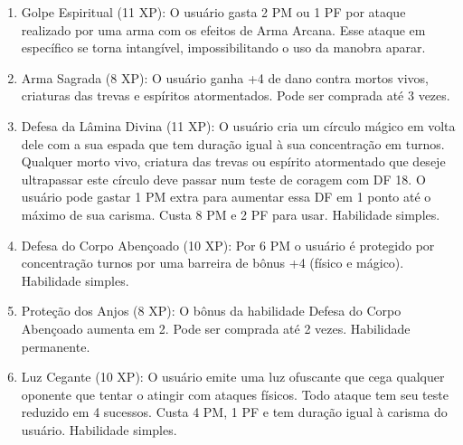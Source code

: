 \begin{enumerate}
  \item Golpe Espiritual (11 XP): O usuário gasta 2 PM ou 1 PF por ataque realizado por uma arma com os efeitos de Arma Arcana. Esse ataque em específico se torna intangível, impossibilitando o uso da manobra aparar.    
        	
  
  	\item Arma Sagrada (8 XP): O usuário ganha +4 de dano contra mortos vivos, criaturas das trevas e espíritos atormentados. Pode ser comprada até 3 vezes.
 
 		\item Defesa da Lâmina Divina (11 XP): O usuário cria um círculo mágico em volta dele com a sua espada que tem duração igual à sua concentração em turnos. Qualquer morto vivo, criatura das trevas ou espírito atormentado que deseje ultrapassar este círculo deve passar num teste de coragem com DF 18. O usuário pode gastar 1 PM extra para aumentar essa DF em 1 ponto até o máximo de sua carisma. Custa 8 PM e 2 PF para usar. Habilidade simples.

  	\item Defesa do Corpo Abençoado (10 XP): Por 6 PM o usuário é protegido por concentração turnos por uma barreira de bônus +4 (físico e mágico). Habilidade simples.

	\item Proteção dos Anjos (8 XP): O bônus da habilidade Defesa do Corpo Abençoado aumenta em 2. Pode ser comprada até 2 vezes. Habilidade permanente.
  	
	\item Luz Cegante (10 XP): O usuário emite uma luz ofuscante que cega qualquer oponente que tentar o atingir com ataques físicos. Todo ataque tem seu teste reduzido em 4 sucessos. Custa 4 PM, 1 PF e tem duração igual à carisma do usuário. Habilidade simples.
 

\end{enumerate}
